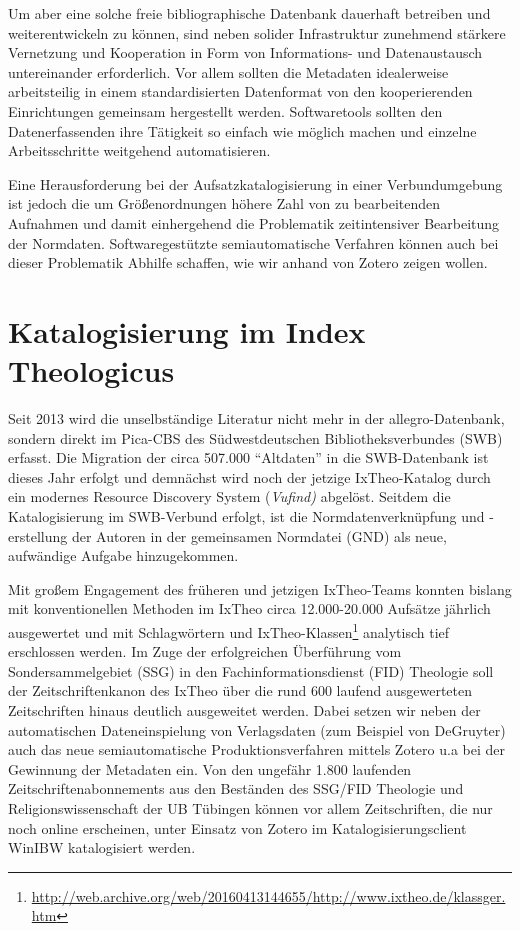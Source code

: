 \documentclass[a4paper,
fontsize=11pt,
oneside,
numbers=noperiodatend,
parskip=half-,
bibliography=totoc,
final
]{scrartcl}
\begin{document}
Um aber eine solche freie bibliographische Datenbank dauerhaft betreiben
und weiterentwickeln zu können, sind neben solider Infrastruktur
zunehmend stärkere Vernetzung und Kooperation in Form von Informations-
und Datenaustausch untereinander erforderlich. Vor allem sollten die
Metadaten idealerweise arbeitsteilig in einem standardisierten
Datenformat von den kooperierenden Einrichtungen gemeinsam hergestellt
werden. Softwaretools sollten den Datenerfassenden ihre Tätigkeit so
einfach wie möglich machen und einzelne Arbeitsschritte weitgehend
automatisieren.

Eine Herausforderung bei der Aufsatzkatalogisierung in einer
Verbundumgebung ist jedoch die um Größenordnungen höhere Zahl von zu
bearbeitenden Aufnahmen und damit einhergehend die Problematik
zeitintensiver Bearbeitung der Normdaten. Softwaregestützte
semiautomatische Verfahren können auch bei dieser Problematik Abhilfe
schaffen, wie wir anhand von Zotero zeigen wollen.

\section*{Katalogisierung im Index
Theologicus}\label{katalogisierung-im-index-theologicus}

Seit 2013 wird die unselbständige Literatur nicht mehr in der
allegro-Datenbank, sondern direkt im Pica-CBS des Südwestdeutschen
Bibliotheksverbundes (SWB) erfasst. Die Migration der circa 507.000
\enquote{Altdaten} in die SWB-Datenbank ist dieses Jahr erfolgt und
demnächst wird noch der jetzige IxTheo-Katalog durch ein modernes
Resource Discovery System (\emph{Vufind)} abgelöst. Seitdem die
Katalogisierung im SWB-Verbund erfolgt, ist die Normdatenverknüpfung und
-erstellung der Autoren in der gemeinsamen Normdatei (GND) als neue,
aufwändige Aufgabe hinzugekommen.

Mit großem Engagement des früheren und jetzigen IxTheo-Teams konnten
bislang mit konventionellen Methoden im IxTheo circa 12.000-20.000
Aufsätze jährlich ausgewertet und mit Schlagwörtern und
IxTheo-Klassen\footnote{\url{http://web.archive.org/web/20160413144655/http://www.ixtheo.de/klassger.htm}}
analytisch tief erschlossen werden. Im Zuge der erfolgreichen
Überführung vom Sondersammelgebiet (SSG) in den Fachinformationsdienst
(FID) Theologie soll der Zeitschriftenkanon des IxTheo über die rund 600
laufend ausgewerteten Zeitschriften hinaus deutlich ausgeweitet werden.
Dabei setzen wir neben der automatischen Dateneinspielung von
Verlagsdaten (zum Beispiel von DeGruyter) auch das neue semiautomatische
Produktionsverfahren mittels Zotero u.a bei der Gewinnung der Metadaten
ein. Von den ungefähr 1.800 laufenden Zeitschriftenabonnements aus den
Beständen des SSG/FID Theologie und Religionswissenschaft der UB
Tübingen können vor allem Zeitschriften, die nur noch online erscheinen,
unter Einsatz von Zotero im Katalogisierungsclient WinIBW katalogisiert
werden.
\end{document}
